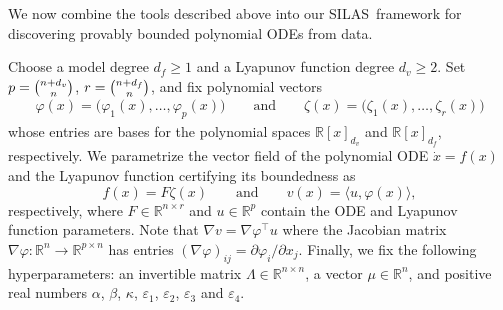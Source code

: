 \documentclass[11pt]{amsart}
\numberwithin{equation}{section}
\theoremstyle{plain}
\theoremstyle{definition}
\theoremstyle{remark}
\newcommand{\R}{\mathbb{R}}
\renewcommand{\vec}[1]{{#1}}
\newcommand{\mat}[1]{{#1}}
\newcommand{\ip}[2]{\langle #1, #2 \rangle}
\newcommand{\methodname}{{SILAS}}
\begin{document}
We now combine the tools described above into our \methodname\ framework for discovering provably bounded polynomial ODEs from data.

Choose a model degree $d_f \geq 1$ and a Lyapunov function degree $d_v \geq 2$. Set $p = \smash{\binom{n+d_v}{n}}$, $r = \smash{\binom{n+d_f}{n}}$, and fix polynomial vectors
\begin{align*}
    \varphi(x) = \big(\varphi_1(x), \ldots, \varphi_p(x)\big) 
    \qquad\text{and}\qquad
    \zeta(x) = \big(\zeta_1(x), \ldots, \zeta_r(x)\big)
\end{align*}
whose entries are bases for the polynomial spaces $\R[x]_{d_v}$ and $\R[x]_{d_f}$, respectively. We parametrize the vector field of the polynomial ODE $\dot{\vec{x}}=\vec{f}(\vec{x})$ and the Lyapunov function certifying its boundedness as
\begin{equation*}
    f(\vec{x})= \mat{F} \zeta(\vec{x})
    \qquad\text{and}\qquad
    v(\vec{x}) = \ip{\vec{u}}{\varphi(\vec{x})},
\end{equation*}
respectively, where $\mat{F} \in \R^{n \times r}$ and $\vec{u}\in\R^p$ contain the ODE and Lyapunov function parameters. Note that $\nabla v = \nabla\varphi^\top u$  where the Jacobian matrix $\nabla \varphi : \R^n \to \R^{p \times n}$ has entries $(\nabla\varphi)_{ij} = \partial \varphi_i / \partial x_j$. 
Finally, we fix the following hyperparameters: an invertible matrix $\mat{\Lambda} \in \R^{n\times n}$, a vector $\vec{\mu} \in \R^n$, and positive real numbers $\alpha$, $\beta$, $\kappa$, $\varepsilon_1$, $\varepsilon_2$, $\varepsilon_3$ and $\varepsilon_4$.
\end{document}
